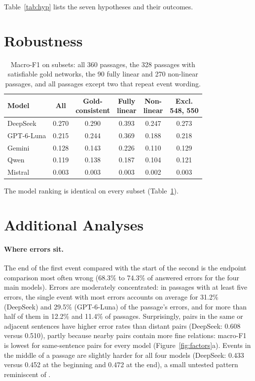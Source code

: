 \documentclass[11pt]{article}
\newcommand{\Ds}{DeepSeek}
\newcommand{\Gp}{GPT-6-Luna}
\newcommand{\Gm}{Gemini}
\newcommand{\Qw}{Qwen}
\newcommand{\Ms}{Mistral}
\begin{document}
Table~\ref{tab:hyp} lists the seven hypotheses and their outcomes.

\section{Robustness}
\label{app:robust}

\begin{table}[!ht]
\centering
\small
\setlength{\tabcolsep}{3.2pt}
\begin{tabular}{l ccccc}
\toprule
Model & All & \makecell{Gold-\\consistent} & \makecell{Fully\\linear} & \makecell{Non-\\linear} & \makecell{Excl.\\548, 550} \\
\midrule
\Ds & 0.270 & 0.290 & 0.393 & 0.247 & 0.273 \\
\Gp & 0.215 & 0.244 & 0.369 & 0.188 & 0.218 \\
\Gm & 0.128 & 0.143 & 0.226 & 0.110 & 0.129 \\
\Qw & 0.119 & 0.138 & 0.187 & 0.104 & 0.121 \\
\Ms & 0.003 & 0.003 & 0.003 & 0.002 & 0.003 \\
\bottomrule
\end{tabular}
\caption{Macro-F1 on subsets: all 360 passages, the 328 passages with satisfiable gold networks, the 90 fully linear and 270 non-linear passages, and all passages except two that repeat event wording.}
\label{tab:robust}
\end{table}

The model ranking is identical on every subset (Table~\ref{tab:robust}).

\section{Additional Analyses}
\label{app:extra}

\paragraph{Where errors sit.}
The end of the first event compared with the start of the second is the endpoint comparison most often wrong (68.3\% to 74.3\% of answered errors for the four main models). Errors are moderately concentrated: in passages with at least five errors, the single event with most errors accounts on average for 31.2\% (\Ds) and 29.5\% (\Gp) of the passage's errors, and for more than half of them in 12.2\% and 11.4\% of passages. Surprisingly, pairs in the same or adjacent sentences have higher error rates than distant pairs (\Ds: 0.608 versus 0.510), partly because nearby pairs contain more fine relations: macro-F1 is lowest for same-sentence pairs for every model (Figure~\ref{fig:factors}a). Events in the middle of a passage are slightly harder for all four models (\Ds: 0.433 versus 0.452 at the beginning and 0.472 at the end), a small untested pattern reminiscent of \citet{liu-etal-2024-lost}.
\end{document}
